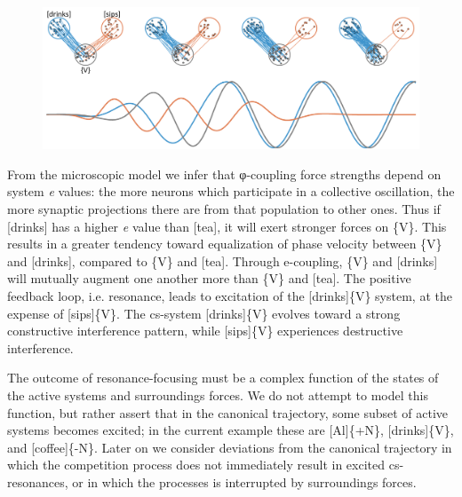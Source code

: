   
\begin{figure}
\includegraphics[width=\textwidth]{figures/Tilsen-img52.png}
\caption{\missingcaption}
\label{fig:}
\end{figure}
 

  From the microscopic model we infer that φ{}-coupling force strengths depend on system \textit{e} values: the more neurons which participate in a collective oscillation, the more synaptic projections there are from that population to other ones. Thus if [drinks] has a higher \textit{e} value than [tea], it will exert stronger forces on \{V\}. This results in a greater tendency toward equalization of phase velocity between \{V\} and [drinks], compared to \{V\} and [tea]. Through e-coupling, \{V\} and [drinks] will mutually augment one another more than \{V\} and [tea]. The positive feedback loop, i.e. resonance, leads to excitation of the [drinks]\{V\} system, at the expense of [sips]\{V\}. The cs-system [drinks]\{V\} evolves toward a strong constructive interference pattern, while [sips]\{V\} experiences destructive interference.

  The outcome of resonance-focusing must be a complex function of the states of the active systems and surroundings forces. We do not attempt to model this function, but rather assert that in the canonical trajectory, some subset of active systems becomes excited; in the current example these are [Al]\{+N\}, [drinks]\{V\}, and [coffee]\{-N\}. Later on we consider deviations from the canonical trajectory in which the competition process does not immediately result in excited cs-resonances, or in which the processes is interrupted by surroundings forces.

